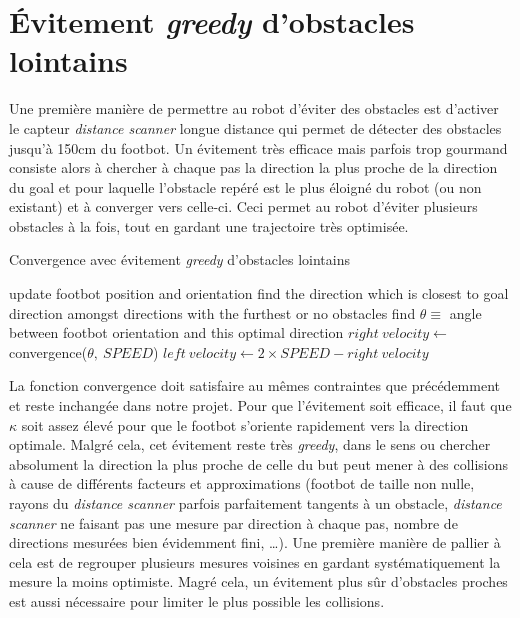 \section{Évitement \emph{greedy} d'obstacles lointains}

Une première manière de permettre au robot d'éviter des obstacles est d'activer le capteur \emph{distance scanner} longue distance qui permet de détecter des obstacles jusqu'à 150cm du footbot. Un évitement très efficace mais parfois trop gourmand consiste alors à chercher à chaque pas la direction la plus proche de la direction du goal et pour laquelle l'obstacle repéré est le plus éloigné du robot (ou non existant) et à converger vers celle-ci. Ceci permet au robot d'éviter plusieurs obstacles à la fois, tout en gardant une trajectoire très optimisée.

\begin{algorithm}
\caption{Convergence avec évitement \emph{greedy} d'obstacles lointains}
\label{greedyConvergence}
\begin{algorithmic}
    \STATE update footbot position and orientation
    \STATE find the direction which is closest to goal direction amongst directions with the furthest or no obstacles
    \STATE find \( \theta \equiv\) angle between footbot orientation and this optimal direction
    \STATE \( right\:velocity \gets\) convergence(\(\theta,\:SPEED\))
    \STATE \( left\:velocity \gets 2 \times SPEED-right\:velocity\) 
  \ENDWHILE
\end{algorithmic}
\end{algorithm}

La fonction convergence doit satisfaire au mêmes contraintes que précédemment et reste inchangée dans notre projet. Pour que l'évitement soit efficace, il faut que $\kappa$ soit assez élevé pour que le footbot s'oriente rapidement vers la direction optimale. Malgré cela, cet évitement reste très \emph{greedy}, dans le sens ou chercher absolument la direction la plus proche de celle du but peut mener à des collisions à cause de différents facteurs et approximations (footbot de taille non nulle, rayons du \emph{distance scanner} parfois parfaitement tangents à un obstacle, \emph{distance scanner} ne faisant pas une mesure par direction à chaque pas, nombre de directions mesurées bien évidemment fini, \ldots). Une première manière de pallier à cela est de regrouper plusieurs mesures voisines en gardant systématiquement la mesure la moins optimiste. Magré cela, un évitement plus sûr d'obstacles proches est aussi nécessaire pour limiter le plus possible les collisions.

